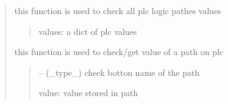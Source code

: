 \documentclass[letterpaper,10pt,english]{sphinxmanual}
\begin{document}
\begin{quote}
\begin{savenotes}
\begin{fulllineitems}
\begin{savenotes}
\begin{fulllineitems}
\begin{quote}
\begin{description}
\end{description}\end{quote}

\end{fulllineitems}\end{savenotes}


\begin{savenotes}\begin{fulllineitems}
\label{\detokenize{setting/setting_api:oxin.setting_api.API.check_all_plc_parms}}
\pysigstartsignatures
{}
\pysigstopsignatures
\sphinxAtStartPar
this function is used to check all plc logic pathes values
\begin{quote}\begin{description}
\sphinxAtStartPar
values: a dict of plc values

\end{description}\end{quote}

\end{fulllineitems}\end{savenotes}


\begin{savenotes}\begin{fulllineitems}
\label{\detokenize{setting/setting_api:oxin.setting_api.API.check_plc_parms}}
\pysigstartsignatures
{}
\pysigstopsignatures
\sphinxAtStartPar
this function is used to check/get value of a path on plc
\begin{quote}\begin{description}
\sphinxAtStartPar
{} – (\_type\_) check botton name of the path

\sphinxAtStartPar
value: value stored in path

\end{description}\end{quote}

\end{fulllineitems}\end{savenotes}


\end{fulllineitems}
\end{savenotes}
\end{quote}
\end{document}
